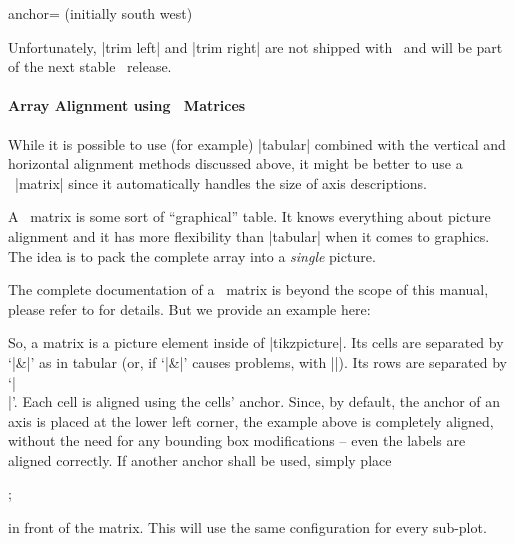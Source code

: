 \begin{pgfplotskey}{anchor= (initially south west)}
\begin{minipage}
\begin{tabular}
\begin{center}
Unfortunately, |trim left| and |trim right| are not shipped with \PGFPlots\ and will be part of the next stable \Tikz\ release.


\paragraph{Array Alignment using \Tikz\ Matrices}
While it is possible to use (for example) |tabular| combined with the vertical and horizontal alignment methods discussed above, it might be better to use a \Tikz\ |matrix| since it automatically handles the size of axis descriptions.

A \Tikz\ matrix is some sort of ``graphical'' table. It knows everything about picture alignment and it has more flexibility than |tabular| when it comes to graphics. The idea is to pack the complete array into a \emph{single} picture.

The complete documentation of a \Tikz\ matrix is beyond the scope of this manual, please refer to \cite{tikz} for details. But we provide an example here:
%
\begin{codeexample}[]
\end{codeexample}
\noindent So, a matrix is a picture element inside of |tikzpicture|. Its cells are separated by `|&|' as in tabular (or, if `|&|' causes problems, with |\pgfmatrixnextcell|). Its rows are separated by `|\\|'. Each cell is aligned using the cells' anchor. Since, by default, the anchor of an axis is placed at the lower left corner, the example above is completely aligned, without the need for any bounding box modifications -- even the labels are aligned correctly. If another anchor shall be used, simply place 
\begin{codeexample}
\pgfplotsset{anchor=....}
;
\end{codeexample}
\noindent in front of the matrix. This will use the same configuration for every sub-plot.


\end{center}
\end{tabular}
\end{minipage}
\end{pgfplotskey}
